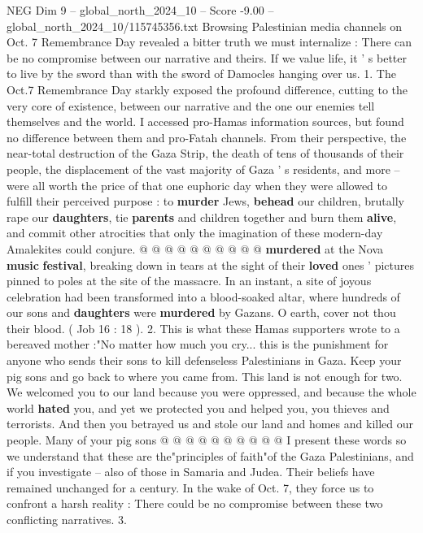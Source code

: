 \begin{textsample}{NEG Dim 9 – global\_north\_2024\_10 – Score -9.00 – global\_north\_2024\_10/115745356.txt}  \label{ex:f9_neg_049}
Browsing Palestinian media channels on Oct. 7 Remembrance Day revealed a bitter truth we must internalize : There can be no compromise between our narrative and theirs.
If we value life, it ' s better to live by the sword than with the sword of Damocles hanging over us. 1.
The Oct.7 Remembrance Day starkly exposed the profound difference, cutting to the very core of existence, between our narrative and the one our enemies tell themselves and the world.
I accessed pro-Hamas information sources, but found no difference between them and pro-Fatah channels.
From their perspective, the near-total destruction of the Gaza Strip, the death of tens of thousands of their people, the displacement of the vast majority of Gaza ' s residents, and more -- were all worth the price of that one euphoric day when they were allowed to fulfill their perceived purpose : to \textbf{murder} Jews, \textbf{behead} our children, brutally rape our \textbf{daughters}, tie \textbf{parents} and children together and burn them \textbf{alive}, and commit other atrocities that only the imagination of these modern-day Amalekites could conjure. @ @ @ @ @ @ @ @ @ @ \textbf{murdered} at the Nova \textbf{music} \textbf{festival}, breaking down in tears at the sight of their \textbf{loved} ones ' pictures pinned to poles at the site of the massacre.
In an instant, a site of joyous celebration had been transformed into a blood-soaked altar, where hundreds of our sons and \textbf{daughters} were \textbf{murdered} by Gazans.
O earth, cover not thou their blood. ( Job 16 : 18 ). 2.
This is what these Hamas supporters wrote to a bereaved mother :"No matter how much you cry... this is the punishment for anyone who sends their sons to kill defenseless Palestinians in Gaza.
Keep your pig sons and go back to where you came from.
This land is not enough for two.
We welcomed you to our land because you were oppressed, and because the whole world \textbf{hated} you, and yet we protected you and helped you, you thieves and terrorists.
And then you betrayed us and stole our land and homes and killed our people.
Many of your pig sons @ @ @ @ @ @ @ @ @ @ I present these words so we understand that these are the"principles of faith"of the Gaza Palestinians, and if you investigate -- also of those in Samaria and Judea.
Their beliefs have remained unchanged for a century.
In the wake of Oct. 7, they force us to confront a harsh reality : There could be no compromise between these two conflicting narratives. 3.

\end{textsample}
